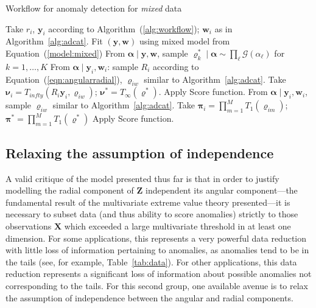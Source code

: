 \begin{algorithm}[htb]
    \caption{Workflow for anomaly detection for \emph{mixed} data}\label{alg:admixed}
    \begin{algorithmic}[1]
        \State Take $r_i$, $\bm{y}_i$ according to Algorithm~(\ref{alg:workflow}); $\bm{w}_i$ as in Algorithm~\ref{alg:adcat}.
        \State Fit $(\bm{y},\bm{w})$ using mixed model from Equation~(\ref{model:mixed})
        \State From $\bm{\alpha}\mid\bm{y},\bm{w}$, sample
            $\bm{\varrho}_k^{*}\mid\bm{\alpha}\sim\prod_{\ell}\mathcal{G}(\alpha_{\ell})$ for $k = 1,\ldots,K$
            \State From $\bm{\alpha}\mid\bm{y}_i,\bm{w}_i$:
                sample $R_i$ according to Equation~(\ref{eqn:angularradial}), 
                $\bm{\varrho}_{iw}$ similar to Algorithm~\ref{alg:adcat}.
            \State Take $\bm{\nu}_i = T_{infty}(R_i\bm{y}_i,\bm{\varrho}_{iw})$;      
                $\bm{\nu}^* = T_{\infty}(\bm{\varrho}^*)$.
            \State Apply Score function.
            \State From $\bm{\alpha}\mid\bm{y}_i,\bm{w}_i$, 
                sample $\bm{\varrho}_{iw}$ similar to Algorithm~\ref{alg:adcat}.
            \State Take $\bm{\pi}_i = \prod_{m = 1}^M T_{1}(\bm{\varrho}_{im})$;    
                $\bm{\pi}^* = \prod_{m = 1}^{M} T_1(\bm{\varrho}^*)$
            \State Apply Score function.
        \EndIf
    \end{algorithmic}
\end{algorithm}

\subsection{Relaxing the assumption of independence\label{subsec:rank}}
A valid critique of the model presented thus far is that in order to justify 
    modelling the radial component of $\bm{Z}$ independent its angular 
    component---the fundamental result of the multivariate extreme value theory 
    presented---it is necessary to subset data (and thus ability to score 
    anomalies) strictly to those observations $\bm{X}$ which exceeded a large 
    multivariate threshold in at least one dimension.  For some applications, 
    this represents a very powerful data reduction with little loss of 
    information pertaining to anomalies, as anomalies tend to be in the tails 
    (see, for  example, Table~\ref{tab:data}).  For other applications, this 
    data reduction represents a significant loss of information about possible
    anomalies not corresponding to the tails.  For this second group,
    one available avenue is to relax the assumption of independence between the 
    angular and radial components.

